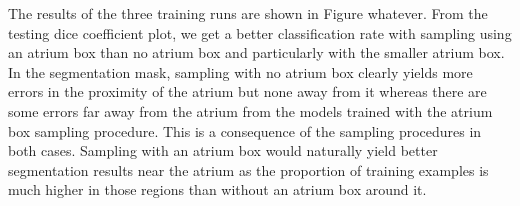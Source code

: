 The results of the three training runs are shown in Figure whatever. From the testing dice coefficient plot, we get a better classification rate with sampling using an atrium box than no atrium box and particularly with the smaller atrium box. In the segmentation mask, sampling with no atrium box clearly yields more errors in the proximity of the atrium but none away from it whereas there are some errors far away from the atrium from the models trained with the atrium box sampling procedure. This is a consequence of the sampling procedures in both cases. Sampling with an atrium box would naturally yield better segmentation results near the atrium as the proportion of training examples is much higher in those regions than without an atrium box around it.\\




